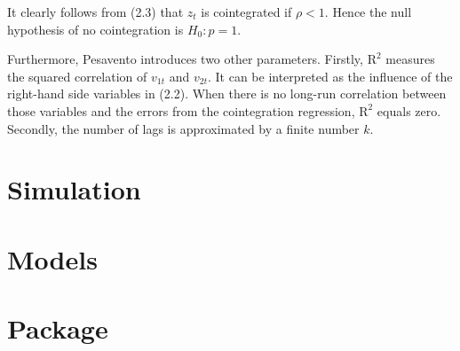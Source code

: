 \documentclass[12pt,a4paper]{article}
\begin{document}
It clearly follows from (2.3) that \(z_t\) is cointegrated if
\(\rho < 1\). Hence the null hypothesis of no cointegration is
\(H_0: p = 1\).

Furthermore, Pesavento introduces two other parameters. Firstly,
\(\text{R}^2\) measures the squared correlation of \(v_{1t}\) and
\(v_{2t}\). It can be interpreted as the influence of the right-hand
side variables in (2.2). When there is no long-run correlation between
those variables and the errors from the cointegration regression,
\(\text{R}^2\) equals zero. Secondly, the number of lags is approximated
by a finite number \(k\).

\hypertarget{simulation}{%
\section{Simulation}\label{simulation}}

\hypertarget{models}{%
\section{Models}\label{models}}

\hypertarget{package}{%
\section{Package}\label{package}}

\pagebreak


\printbibliography[title = References]
\cleardoublepage

\begin{refsection}
\nocite{R-base}
\nocite{R-stargazer}
\nocite{R-stringr}
\nocite{R-tidyr}
\nocite{R-dplyr}
\nocite{R-glmnet}
\nocite{R-class}
\nocite{R-MASS}
\nocite{R-plm}
\nocite{R-leaps}
\nocite{R-caret}
\nocite{R-tree}
\nocite{R-gbm}
\nocite{R-plotmo}
\nocite{R-pls}
\nocite{R-splines}
\nocite{R-tictoc}
\nocite{R-plotly}
\nocite{R-inspectdf}
\nocite{R-rpart}
\nocite{R-rpart.plot}
\nocite{R-stargazer}
\nocite{R-knitr}
\nocite{R-purrr}
\nocite{R-randomForest}
\nocite{R-rstudioapi}





\nocite{R-Studio}

\printbibliography[title = Software-References]
\end{refsection}
\end{document}
